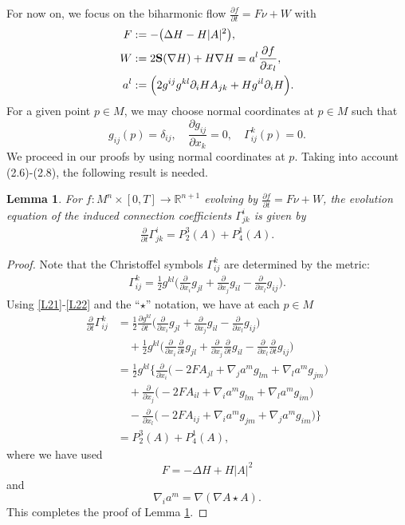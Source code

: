 \documentclass{amsart}
\newtheorem{lemma}[theorem]{Lemma}
\theoremstyle{definition}
\numberwithin{equation}{section}
\begin{document}
For now on, we focus   on the biharmonic flow  $ \frac{\partial f}{\partial t}=F \nu+W$ with
\begin{align}
F&:=-\big(\Delta
H-H\vert A\vert ^2\big),\\
 W&:= 2{\bf S}(\nabla H)+H\nabla H= a^l\frac {\partial f}{\partial x_l },\\
 a^l&:= \Big (2g^{ij}g^{kl}\partial_iHA_{jk}+H g^{il}\partial_i H\Big ).
\end{align}
For a given point $p\in M $, we may choose normal coordinates at $p\in M$ such that
\[g_{ij}(p)=\delta_{ij},\quad \frac {\partial g_{ij}}{\partial x_k}=0,\quad \Gamma^{k}_{ij}(p)=0.\]
We proceed in our proofs by
using normal coordinates at $p$. Taking into account (2.6)-(2.8), the following result is needed.
\begin{lemma} \label{T:evlneqns}
    For $f: M^n\times [0, T] \rightarrow \mathbb{R}^{n+1}$ evolving by $ \frac{\partial f}{\partial t}=F \nu+W$, the evolution equation of the
    induced connection coefficients $\Gamma^{i}_{jk}$ is given by
\begin{align}
 \label{L2.4}\frac{\partial}{\partial t} \Gamma^{i}_{jk} =  P_2^3(A)+P_4^1(A)\mbox{.}
\end{align}
\end{lemma}
\begin{proof}

Note that the Christoffel symbols $\Gamma^{k}_{ij}$ are determined by the
metric:
\begin{align}
 \Gamma^{k}_{ij} =\frac{1}{2} g^{kl}\Big(\frac{\partial}{\partial x_i }g_{jl}+
 \frac{\partial}{\partial x_j }g_{il}-\frac{\partial}{\partial x_l }g_{ij}\Big).\nonumber
\end{align}
Using \eqref{L21}-\eqref{L22} and the ``$\star$'' notation,  we have at each $p\in M$
\begin{align}
\frac{\partial}{\partial t} \Gamma^{k}_{ij} &=\frac{1}{2}
\frac{\partial g^{kl}}{\partial t}\Big(\frac{\partial}{\partial x_i
}g_{jl}+
 \frac{\partial}{\partial x_j }g_{il}-\frac{\partial}{\partial x_l }g_{ij}\Big) \nonumber\\
 &\quad+\frac{1}{2} g^{kl}\Big(\frac{\partial}{\partial x_i }\frac{\partial }{\partial t}g_{jl}+
 \frac{\partial}{\partial x_j }\frac{\partial }{\partial t}g_{il}-\frac{\partial}{\partial x_l }\frac{\partial }{\partial
 t}g_{ij}\Big)\nonumber\\
&= \frac{1}{2} g^{kl}\Big\{\frac{\partial}{\partial x_i }\big(-2F A_{jl}+\nabla_j a^m g_{lm}+\nabla_l a^mg_{jm}\big)\nonumber\\
&\quad+
 \frac{\partial}{\partial x_j }\big(-2F A_{il}+\nabla_i a^m g_{lm}+\nabla_l a^mg_{im}\big)\nonumber\\
&\quad-\frac{\partial}{\partial x_l }\big(-2F A_{ij}+\nabla_i a^m g_{jm}+\nabla_j a^mg_{im}\big)\Big\}\nonumber\\
&= P_2^3(A)+P_4^1(A)\nonumber,
\end{align}
where we have used $$F=-\Delta H+H|A|^2$$ and $$\nabla_i a^m=\nabla (\nabla A\star A).$$
This completes the proof of Lemma \ref{T:evlneqns}.
\end{proof}
\end{document}
